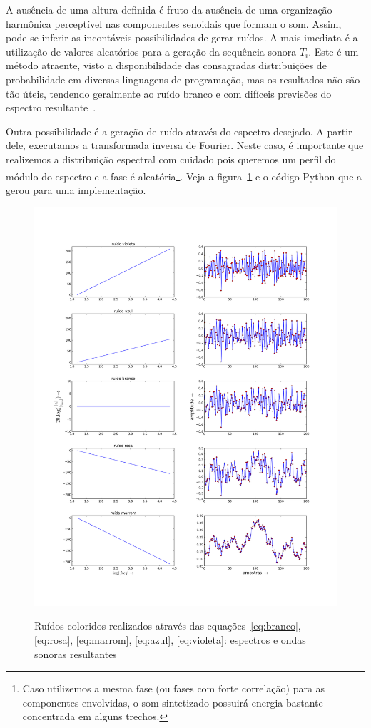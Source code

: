 A ausência de uma altura definida é fruto da ausência de uma organização harmônica perceptível nas componentes senoidais que formam o som. Assim, pode-se inferir
as incontáveis possibilidades de gerar ruídos. A mais imediata é a utilização
de valores aleatórios para a geração da sequência sonora $T_i$. Este
é um método atraente, visto a disponibilidade
das consagradas distribuições de probabilidade em diversas linguagens de programação,
mas os resultados não são tão úteis, tendendo geralmente ao ruído branco
e com difíceis previsões do espectro resultante~\cite{Cook}.

Outra possibilidade é a geração de ruído através do espectro desejado. A partir
dele, executamos a transformada inversa de Fourier. Neste caso, é importante
que realizemos a distribuição espectral com cuidado pois queremos um perfil
do módulo do espectro e a fase é aleatória\footnote{Caso utilizemos a mesma fase
(ou fases com forte correlação) para
as componentes envolvidas, o som sintetizado possuirá energia bastante concentrada
em alguns trechos.}. Veja a figura~\ref{fig:ruidos} e o código Python que a gerou para uma implementação.


\begin{figure}[htpq!]
    \centering
    \caption{Ruídos coloridos realizados através das equações~\ref{eq:branco}, \ref{eq:rosa}, \ref{eq:marrom}, \ref{eq:azul}, \ref{eq:violeta}: espectros e ondas sonoras resultantes}
        \includegraphics[width=\textwidth]{figuras/ruidos___}
        \label{fig:ruidos}
\end{figure}


